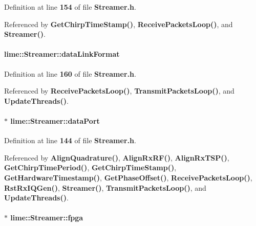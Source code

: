 Definition at line {\bf 154} of file {\bf Streamer.\+h}.



Referenced by {\bf Get\+Chirp\+Time\+Stamp()}, {\bf Receive\+Packets\+Loop()}, and {\bf Streamer()}.

\paragraph[{data\+Link\+Format}]{ lime\+::\+Streamer\+::data\+Link\+Format}\label{classlime_1_1Streamer_a4d54c12664e65d2cceae1428e2d7d7fe}


Definition at line {\bf 160} of file {\bf Streamer.\+h}.



Referenced by {\bf Receive\+Packets\+Loop()}, {\bf Transmit\+Packets\+Loop()}, and {\bf Update\+Threads()}.

\paragraph[{data\+Port}]{$\ast$ lime\+::\+Streamer\+::data\+Port}\label{classlime_1_1Streamer_a7282280d633007bb7fd2d1e27a698ae7}


Definition at line {\bf 144} of file {\bf Streamer.\+h}.



Referenced by {\bf Align\+Quadrature()}, {\bf Align\+Rx\+R\+F()}, {\bf Align\+Rx\+T\+S\+P()}, {\bf Get\+Chirp\+Time\+Period()}, {\bf Get\+Chirp\+Time\+Stamp()}, {\bf Get\+Hardware\+Timestamp()}, {\bf Get\+Phase\+Offset()}, {\bf Receive\+Packets\+Loop()}, {\bf Rst\+Rx\+I\+Q\+Gen()}, {\bf Streamer()}, {\bf Transmit\+Packets\+Loop()}, and {\bf Update\+Threads()}.

\paragraph[{fpga}]{$\ast$ lime\+::\+Streamer\+::fpga\hspace{0.3cm}{\ttfamily [private]}}\label{classlime_1_1Streamer_a729560ce9527503e12f21c64e6e5d781}


